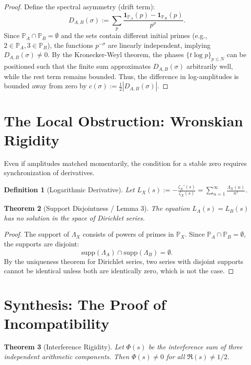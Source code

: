 \documentclass[a4paper,11pt]{article}
\newtheorem{theorem}{Theorem}[section]
\newtheorem{definition}[theorem]{Definition}
\begin{document}
\begin{proof}
Define the spectral asymmetry (drift term):
\begin{equation}
    D_{A,B}(\sigma) := \sum_{p} \frac{\mathbf{1}_{\mathbb{P}_A}(p) - \mathbf{1}_{\mathbb{P}_B}(p)}{p^\sigma}.
\end{equation}
Since $\mathbb{P}_A \cap \mathbb{P}_B = \emptyset$ and the sets contain different initial primes (e.g., $2 \in \mathbb{P}_A, 3 \in \mathbb{P}_B$), the functions $p^{-\sigma}$ are linearly independent, implying $D_{A,B}(\sigma) \neq 0$.
By the Kronecker-Weyl theorem, the phases $\{t \log p\}_{p \le N}$ can be positioned such that the finite sum approximates $D_{A,B}(\sigma)$ arbitrarily well, while the rest term remains bounded. Thus, the difference in log-amplitudes is bounded away from zero by $c(\sigma) := \frac{1}{2}|D_{A,B}(\sigma)|$.
\end{proof}

\section{The Local Obstruction: Wronskian Rigidity}
Even if amplitudes matched momentarily, the condition for a stable zero requires synchronization of derivatives.

\begin{definition}[Logarithmic Derivative]
Let $L_X(s) := -\frac{\zeta_X'(s)}{\zeta_X(s)} = \sum_{n=1}^\infty \frac{\Lambda_X(n)}{n^s}$.
\end{definition}

\begin{theorem}[Support Disjointness / Lemma 3]
The equation $L_A(s) = L_B(s)$ has no solution in the space of Dirichlet series.
\end{theorem}

\begin{proof}
The support of $\Lambda_X$ consists of powers of primes in $\mathbb{P}_X$. Since $\mathbb{P}_A \cap \mathbb{P}_B = \emptyset$, the supports are disjoint:
\begin{equation}
    \text{supp}(\Lambda_A) \cap \text{supp}(\Lambda_B) = \emptyset.
\end{equation}
By the uniqueness theorem for Dirichlet series, two series with disjoint supports cannot be identical unless both are identically zero, which is not the case.
\end{proof}

\section{Synthesis: The Proof of Incompatibility}
\begin{theorem}[Interference Rigidity]
Let $\Phi(s)$ be the interference sum of three independent arithmetic components. Then $\Phi(s) \neq 0$ for all $\Re(s) \neq 1/2$.
\end{theorem}
\end{document}

